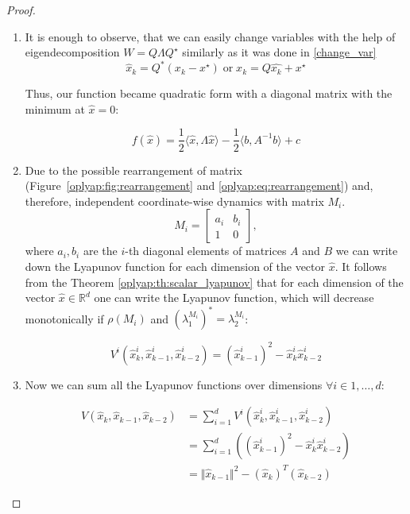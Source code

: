 \documentclass[a4paper,11pt]{article}
\begin{document}
\begin{proof}
 \begin{enumerate}
 \item It is enough to observe, that we can easily change variables with the help of eigendecomposition $W = Q \Lambda Q^\star$ similarly as it was done in \eqref{change_var} 
 \[
 \hat{x}_{k} = Q^*(x_k - x^\star) \; \text{or} \; x_k = Q \hat{x_k} + x^\star
 \]

 Thus, our function became quadratic form with a diagonal matrix with the minimum at $\hat{x} = 0$:

 \[
 f(\hat{x}) = \frac12 \langle \hat{x}, \Lambda \hat{x}\rangle - \frac12\langle b, A^{-1}b\rangle + c
 \]

 \item Due to the possible rearrangement of matrix (Figure~\ref{oplyap:fig:rearrangement} and \eqref{oplyap:eq:rearrangement}) and, therefore, independent coordinate-wise dynamics with matrix $M_i$.
 \begin{equation*}
 M_i = \begin{bmatrix} 
 a_i & b_i \\
 1 & 0
 \end{bmatrix},
 \end{equation*}
 where $a_i, b_i$ are the $i$-th diagonal elements of matrices $A$ and $B$ we can write down the Lyapunov function for each dimension of the vector $\hat{x}$. It follows from the Theorem \ref{oplyap:th:scalar_lyapunov} that for each dimension of the vector $\hat{x} \in \mathbb{R}^d$ one can write the Lyapunov function, which will decrease monotonically if $\rho(M_i)$ and $(\lambda_1^{M_i})^* = \lambda_2^{M_i}$:

 \begin{equation*}
 V^i(\hat{x}^i_k, \hat{x}^i_{k-1}, \hat{x}^i_{k-2}) = \left(\hat{x}^i_{k-1}\right)^2 - \hat{x}^i_k \hat{x}^i_{k-2}
 \end{equation*}

 \item Now we can sum all the Lyapunov functions over dimensions $\forall i \in 1, \ldots, d$:
 
 \begin{equation*}
 \begin{split}
 V(\hat{x}_k, \hat{x}_{k-1}, \hat{x}_{k-2}) &= \sum_{i=1}^d V^i(\hat{x}^i_k, \hat{x}^i_{k-1}, \hat{x}^i_{k-2}) \\
 &= \sum_{i=1}^d \left( \left(\hat{x}^i_{k-1}\right)^2 - \hat{x}^i_k \hat{x}^i_{k-2}\right) \\
 &= \Vert \hat{x}_{k-1}\Vert ^2 -(\hat{x}_k)^T(\hat{x}_{k-2})
 \end{split}
 \end{equation*}


\end{enumerate}
\end{proof}
\end{document}

